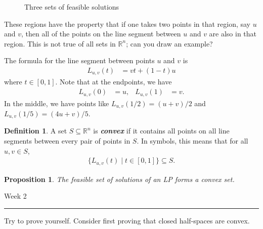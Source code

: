 \documentclass[a4paper, 12pt]{article}
\numberwithin{equation}{section}
\numberwithin{figure}{section}
\newtheorem{prop}[thm]{Proposition}
\theoremstyle{definition}
\newtheorem{defn}[thm]{Definition}
\newcommand{\R}{\mathbb{R}}
\newcommand{\define}[1]{\textbf{\textit{#1}}}
\newcommand{\WEEK}[1]{%
\hfill Week #1

\vspace{-1em}

\begin{center}
	\rule{\textwidth}{2pt}
\end{center}
\vspace{0.5em}%
}
\begin{document}
\begin{figure}[h]
\begin{subfigure}{0.3\textwidth}
	\end{subfigure}
	\caption{Three sets of feasible solutions}
\end{figure}

These regions have the property that if one takes two points in that region, say
$u$ and $v$, then all of the points on the line segment between $u$ and $v$ are
also in that region. This is not true of all sets in $\R^n$; can you draw an
example? 

The formula for the line segment between points $u$ and $v$ is 
\begin{align*}
	L_{u,v}(t) &= vt + (1 - t)u
\end{align*}
where $t\in [0,1]$. Note that at the endpoints, we have 
\begin{align*}
	L_{u,v}(0) &= u, & L_{u,v}(1) &= v.
\end{align*}
In the middle, we have points like $L_{u,v}(1/2) = (u + v)/2$ and $L_{u,v}(1/5)
= (4u + v)/5$. 

\begin{defn}
	A set $S\subseteq \R^n$ is \define{convex} if it contains all points on all
	line segments between every pair of points in $S$. In symbols, this means
	that for all $u,v\in S$, 
	\begin{align*}
		\{L_{u,v}(t) \mid t\in [0,1]\} \subseteq S.
	\end{align*}
\end{defn}

\begin{prop}\label{prop:convex-LP}
	The feasible set of solutions of an LP forms a convex set. 
\end{prop}

\WEEK{2}

Try to prove  yourself. Consider first proving that closed
half-spaces are convex. 
\end{document}
